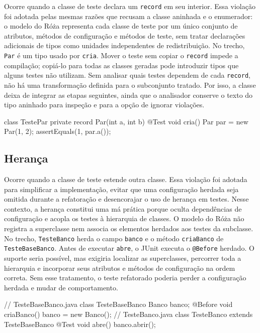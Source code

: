 Ocorre quando a classe de teste declara um \texttt{record} em seu interior. Essa violação foi adotada pelas mesmas razões que recusam a classe aninhada e o enumerador: o modelo do Róża representa cada classe de teste por um único conjunto de atributos, métodos de configuração e métodos de teste, sem tratar declarações adicionais de tipos como unidades independentes de redistribuição. No trecho, \texttt{Par} é um tipo usado por \texttt{cria}. Mover o teste sem copiar o \texttt{record} impede a compilação; copiá-lo para todas as classes geradas pode introduzir tipos que alguns testes não utilizam. Sem analisar quais testes dependem de cada \texttt{record}, não há uma transformação definida para o subconjunto tratado. Por isso, a classe deixa de integrar as etapas seguintes, ainda que o analisador conserve o texto do tipo aninhado para inspeção e para a opção de ignorar violações.

\begin{violationexample}
class TestePar {
    private record Par(int a, int b) {}
    @Test void cria() {
        Par par = new Par(1, 2);
        assertEquals(1, par.a());
    }
}
\end{violationexample}

\subsection{Herança}

Ocorre quando a classe de teste estende outra classe. Essa violação foi adotada para simplificar a implementação, evitar que uma configuração herdada seja omitida durante a refatoração e desencorajar o uso de herança em testes. Nesse contexto, a herança constitui uma má prática porque oculta dependências de configuração e acopla os testes à hierarquia de classes. O modelo do Róża não registra a superclasse nem associa os elementos herdados aos testes da subclasse. No trecho, \texttt{TesteBanco} herda o campo \texttt{banco} e o método \texttt{criaBanco} de \texttt{TesteBaseBanco}. Antes de executar \texttt{abre}, o JUnit executa o \texttt{@Before} herdado. O suporte seria possível, mas exigiria localizar as superclasses, percorrer toda a hierarquia e incorporar seus atributos e métodos de configuração na ordem correta. Sem esse tratamento, o teste refatorado poderia perder a configuração herdada e mudar de comportamento.

\begin{violationexample}
// TesteBaseBanco.java
class TesteBaseBanco {
    Banco banco;
    @Before void criaBanco() { banco = new Banco(); }
}
// TesteBanco.java
class TesteBanco extends TesteBaseBanco {
    @Test void abre() { banco.abrir(); }
}
\end{violationexample}

